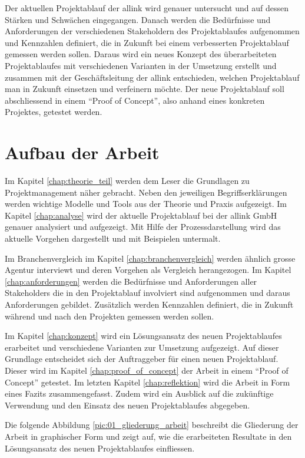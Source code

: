 Der aktuellen Projektablauf der allink wird genauer untersucht und auf 
dessen Stärken und Schwächen eingegangen. Danach werden die Bedürfnisse und 
Anforderungen der verschiedenen Stakeholdern des Projektablaufes aufgenommen und
Kennzahlen definiert, die in Zukunft bei einem verbesserten Projektablauf gemessen 
werden sollen. Daraus wird ein neues Konzept des überarbeiteten Projektablaufes 
mit verschiedenen Varianten in der Umsetzung erstellt und zusammen mit der 
Geschäftsleitung der allink entschieden, welchen Projektablauf 
man in Zukunft einsetzen und verfeinern möchte. Der neue Projektablauf soll 
abschliessend in einem ``Proof of Concept'', also anhand eines konkreten Projektes, 
getestet werden.

\section{Aufbau der Arbeit}
Im Kapitel \ref{chap:theorie_teil} werden dem Leser die Grundlagen zu Projektmanagement 
näher gebracht. Neben den jeweiligen Begriffserklärungen werden wichtige Modelle 
und Tools aus der Theorie und Praxis aufgezeigt.
Im Kapitel \ref{chap:analyse} wird der aktuelle Projektablauf bei der allink
GmbH genauer analysiert und aufgezeigt. Mit Hilfe der Prozessdarstellung wird
das aktuelle Vorgehen dargestellt und mit Beispielen untermalt.

Im Branchenvergleich im Kapitel \ref{chap:branchenvergleich} werden ähnlich 
grosse Agentur interviewt und deren Vorgehen als Vergleich herangezogen.
Im Kapitel \ref{chap:anforderungen} werden die Bedürfnisse und Anforderungen 
aller Stakeholders die in den Projektablauf involviert sind aufgenommen und daraus
Anforderungen gebildet. Zusätzlich werden Kennzahlen definiert, die in Zukunft
während und nach den Projekten gemessen werden sollen.

Im Kapitel \ref{chap:konzept} wird ein Lösungsansatz des neuen Projektablaufes
erarbeitet und verschiedene Varianten zur Umsetzung aufgezeigt. Auf dieser Grundlage
entscheidet sich der Auftraggeber für einen neuen Projektablauf. Dieser wird
im Kapitel \ref{chap:proof_of_concept} der Arbeit in einem ``Proof of Concept'' 
getestet. Im letzten Kapitel \ref{chap:reflektion} wird die Arbeit in Form eines Fazits 
zusammengefasst. Zudem wird ein Ausblick auf die zukünftige Verwendung und den 
Einsatz des neuen Projektablaufes abgegeben.

Die folgende Abbildung \ref{pic:01_gliederung_arbeit} beschreibt die Gliederung der 
Arbeit in graphischer Form und zeigt auf, wie die erarbeiteten Resultate in
den Lösungsansatz des neuen Projektablaufes einfliessen.

